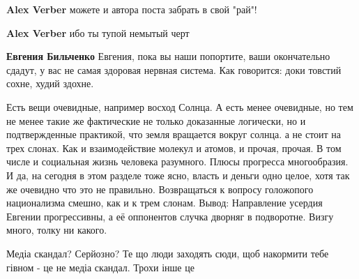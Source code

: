 \begin{itemize}
\begin{itemize}
\textbf{Alex Verber} можете и автора поста забрать в свой "рай"!

 
\textbf{Alex Verber} ибо ты тупой немытый черт

 
\textbf{Евгения Бильченко} Евгения, пока вы наши попортите, ваши окончательно сдадут, у вас не самая здоровая нервная система. Как говорится: доки товстий сохне, худий здохне.

\end{itemize}

 

Есть вещи очевидные, например восход Солнца. А есть менее очевидные, но тем не
менее такие же фактические не только доказанные логически, но и подтвержденные
практикой, что земля вращается вокруг солнца. а не стоит на трех слонах. Как и
взаимодействие молекул и атомов, и прочая, прочая. В том числе и социальная жизнь
человека разумного. Плюсы прогресса многообразия. И да, на сегодня в этом разделе
тоже ясно, власть и деньги одно целое, хотя так же очевидно что это не правильно.
Возвращаться к вопросу голожопого национализма смешно, как и к трем
слонам. Вывод: Направление усердия Евгении прогрессивны, а её оппонентов случка
дворняг в подворотне. Визгу много, толку ни какого.


 

Медіа скандал? Серйозно? Те що люди заходять сюди, щоб накормити тебе гівном -
це не медіа скандал. Трохи інше це


\end{itemize}
